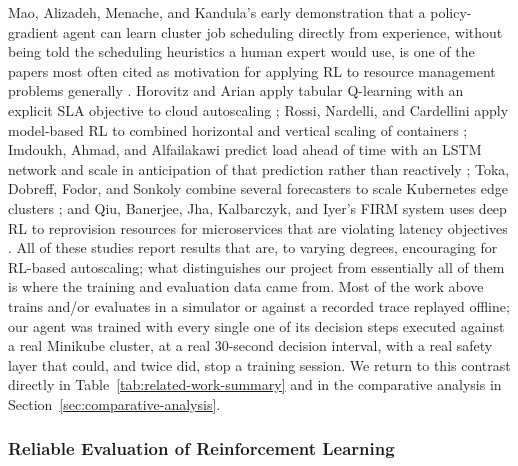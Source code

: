 Mao, Alizadeh, Menache, and Kandula's early demonstration that a
policy-gradient agent can learn cluster job scheduling directly from
experience, without being told the scheduling heuristics a human expert
would use, is one of the papers most often cited as motivation for applying
RL to resource management problems generally \cite{mao2016resource}.
Horovitz and Arian apply tabular Q-learning with an explicit SLA objective
to cloud autoscaling \cite{horovitz2018qlearning}; Rossi, Nardelli, and
Cardellini apply model-based RL to combined horizontal and vertical scaling
of containers \cite{rossi2019horizontal}; Imdoukh, Ahmad, and Alfailakawi
predict load ahead of time with an LSTM network and scale in anticipation of
that prediction rather than reactively \cite{imdoukh2020lstm}; Toka,
Dobreff, Fodor, and Sonkoly combine several forecasters to scale Kubernetes
edge clusters \cite{toka2021edge}; and Qiu, Banerjee, Jha, Kalbarczyk, and
Iyer's FIRM system uses deep RL to reprovision resources for microservices
that are violating latency objectives \cite{qiu2020firm}. All of these
studies report results that are, to varying degrees, encouraging for
RL-based autoscaling; what distinguishes our project from essentially all of
them is where the training and evaluation data came from. Most of the work
above trains and/or evaluates in a simulator or against a recorded trace
replayed offline; our agent was trained with every single one of its
decision steps executed against a real Minikube cluster, at a real
30-second decision interval, with a real safety layer that could, and
twice did, stop a training session. We return to this contrast directly in
Table~\ref{tab:related-work-summary} and in the comparative analysis in
Section~\ref{sec:comparative-analysis}.

\subsubsection{Reliable Evaluation of Reinforcement Learning}

